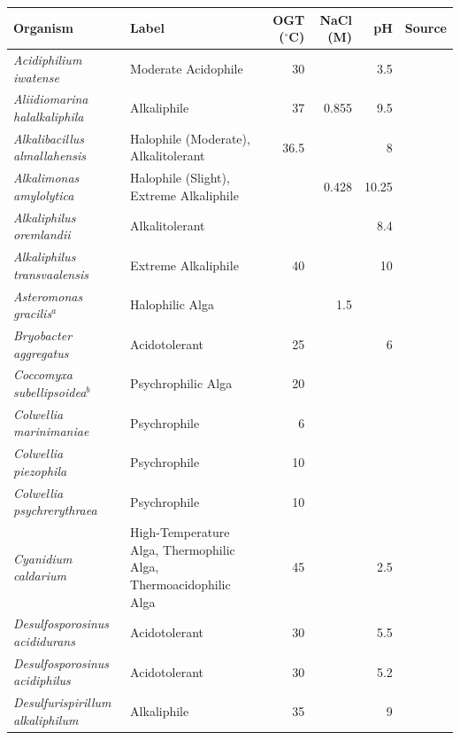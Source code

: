 \begin{tabular}{lp{4.2cm}rrrl}
\hline
\textbf{Organism} & \textbf{Label} & \textbf{OGT ($^\circ$C)} & \textbf{NaCl (M)} & \textbf{pH} & \textbf{Source} \\
\hline
\textit{Acidiphilium iwatense} & Moderate Acidophile & 30 &  & 3.5 & \cite{okamura2015acidiphilium} \\
\textit{Aliidiomarina halalkaliphila} & Alkaliphile & 37 & 0.855 & 9.5 & \cite{yang2022aliidiomarina} \\
\textit{Alkalibacillus almallahensis} & Halophile (Moderate), Alkalitolerant & 36.5 &  & 8 & \cite{perezdavo2014alkalibacillus} \\
\textit{Alkalimonas amylolytica} & Halophile (Slight), Extreme Alkaliphile &  & 0.428 & 10.25 & \cite{ma2004alkalimonas} \\
\textit{Alkaliphilus oremlandii} & Alkalitolerant &  &  & 8.4 & \cite{fisher2008transformation} \\
\textit{Alkaliphilus transvaalensis} & Extreme Alkaliphile & 40 &  & 10 & \cite{takai2001alkaliphilus} \\
\textit{Asteromonas gracilis}$^{a}$ & Halophilic Alga &  & 1.5 &  & \cite{benamotz1981osmoregulation} \\
\textit{Bryobacter aggregatus} & Acidotolerant & 25 &  & 6 & \cite{kulichevskaya2010bryobacter} \\
\textit{Coccomyxa subellipsoidea}$^{b}$ & Psychrophilic Alga & 20 &  &  & \cite{blanc2012genome} \\
\textit{Colwellia marinimaniae} & Psychrophile & 6 &  &  & \cite{kusube2017colwellia} \\
\textit{Colwellia piezophila} & Psychrophile & 10 &  &  & \cite{nogi2004colwellia} \\
\textit{Colwellia psychrerythraea} & Psychrophile & 10 &  &  & \cite{leiros2007structure} \\
\textit{Cyanidium caldarium} & High-Temperature Alga, Thermophilic Alga, Thermoacidophilic Alga & 45 &  & 2.5 & \cite{doemel1971physiological} \\
\textit{Desulfosporosinus acididurans} & Acidotolerant & 30 &  & 5.5 & \cite{sanchezandrea2015desulfosporosinus} \\
\textit{Desulfosporosinus acidiphilus} & Acidotolerant & 30 &  & 5.2 & \cite{alazard2010desulfosporosinus} \\
\textit{Desulfurispirillum alkaliphilum} & Alkaliphile & 35 &  & 9 & \cite{sorokin2007desulfurispirillum} \\

\end{tabular}
